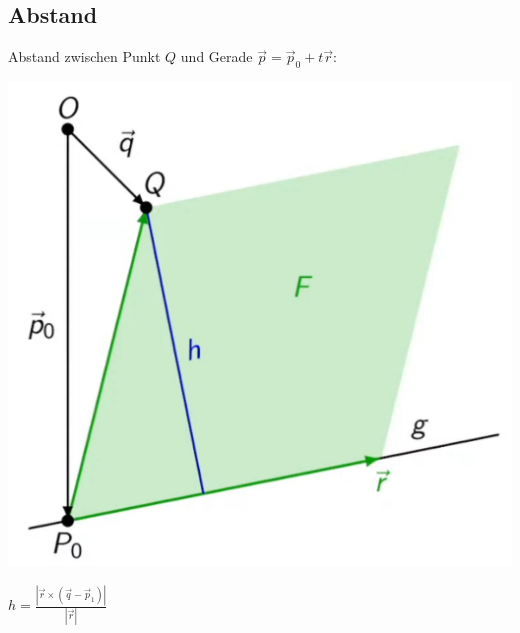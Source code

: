 \subsection{Abstand}
\noindent Abstand zwischen Punkt $Q$ und Gerade $\vec{p} = \vec{p}_0 + t\vec{r}$: 
\begin{center}
	\begin{minipage}{0.25\textwidth}
		\includegraphics[width=\linewidth,keepaspectratio=true]{./Images/AbstandPunkt.png}
	\end{minipage}%
	\begin{minipage}{0.2\textwidth}
			$h = \frac{\left|\vec{r} \times (\vec{q} - \vec{p}_1)\right|}{\left|\vec{r}\right|}$
	\end{minipage}
\end{center}

